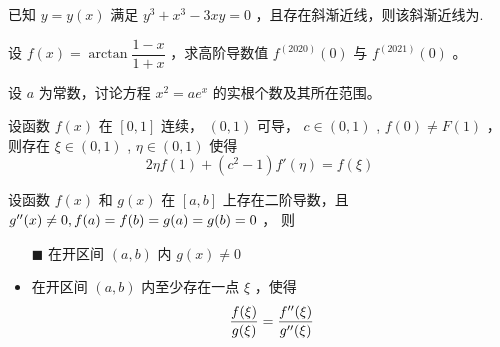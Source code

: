 \begin{quest}[C2T11]
    已知 $ y = y(x) $ 满足 $ y^3+x^3-3xy = 0 $ ，且存在斜渐近线，则该斜渐近线为\qline.
\end{quest}

\begin{quest}[C2T17]
    设 $ f(x) = \arctan \dfrac{1-x}{1+x} $ ，求高阶导数值 $ f^{(2020)}(0) $ 与 $ f^{(2021)}(0) $ 。
\end{quest}

\begin{quest}[C2T20]
    设 $ a $ 为常数，讨论方程 $ x^2=ae^x $ 的实根个数及其所在范围。
\end{quest}


\begin{quest}[C2T21]
    设函数 $ f(x) $ 在 $ [0,1] $ 连续， $ (0,1) $ 可导， $ c\in (0,1) $ , $ f(0)\neq F(1) $ ，
    则存在 $ \xi\in (0,1) $ , $ \eta\in (0,1) $ 使得 $$
        2\eta f(1) + (c^2-1)f'(\eta) = f(\xi)
    $$ 
\end{quest}

\begin{quest}[C2T22]
    设函数 $ f(x) $ 和 $ g(x) $ 在 $ [a,b] $ 上存在二阶导数，且 $ g^{\prime\prime}(x)\neq 0, f(a)=f(b)=g(a)=g(b) = 0 $ ，
    则\begin{itemize}
        \item[$ \blacksquare $ ] 在开区间 $ (a,b) $ 内 $ g(x)\neq 0 $ 
        \item 在开区间 $ (a,b) $ 内至少存在一点 $ \xi $ ，使得$$
            \dfrac{f(\xi)}{g(\xi)} = \dfrac{f^{\prime\prime}(\xi)}{g^{\prime\prime}(\xi)}
        $$ 
    \end{itemize}
\end{quest}

